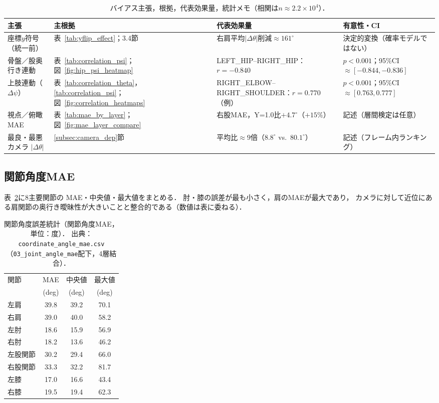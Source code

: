\documentclass[fleqn]{ieej}
\begin{document}
\begin{table}[!t]
\centering
\caption{バイアス主張，根拠，代表効果量，統計メモ（相関は$n\approx 2.2\times 10^{4}$）．}
\label{tab:bias_claim_evidence}
\footnotesize
\begin{tabular}{p{} p{} p{} p{}}
\toprule
主張 & 主根拠 & 代表効果量 & 有意性・CI \\
\midrule
座標$y$符号（統一前） &
表~\ref{tab:yflip_effect}；3.4節 &
右肩平均$|\Delta\theta|$削減$\approx\!161^{\circ}$ &
決定的変換（確率モデルではない） \\
骨盤／股奥行き連動 &
表~\ref{tab:correlation_psi}；図~\ref{fig:hip_psi_heatmap} &
LEFT\_HIP--RIGHT\_HIP：$r=-0.840$ &
$p<0.001$；95\%CI $\approx[-0.844,-0.836]$ \\
上肢連動（$\Delta\psi$） &
表~\ref{tab:correlation_theta}，\ref{tab:correlation_psi}；
図~\ref{fig:correlation_heatmaps} &
RIGHT\_ELBOW--RIGHT\_SHOULDER：$r=0.770$（例） &
$p<0.001$；95\%CI $\approx[0.763,0.777]$ \\
視点／俯瞰MAE &
表~\ref{tab:mae_by_layer}；図~\ref{fig:mae_layer_compare} &
右股MAE，Y=1.0比$+4.7^{\circ}$（$+15\%$） &
記述（層間検定は任意） \\
最良・最悪カメラ $|\Delta\theta|$ &
\ref{subsec:camera_dep}節 &
平均比$\approx 9$倍（$8.8^{\circ}$ vs.\ $80.1^{\circ}$） &
記述（フレーム内ランキング） \\
\bottomrule
\end{tabular}
\end{table}

\subsection{関節角度MAE}

表~\ref{tab:joint_angle_error}に8主要関節の
MAE・中央値・最大値をまとめる．
肘・膝の誤差が最も小さく，肩のMAEが最大であり，
カメラに対して近位にある肩関節の奥行き曖昧性が大きいことと整合的である（数値は表に委ねる）．

\begin{table}[!t]
\centering
\caption{関節角度誤差統計（関節角度MAE，単位：度）．
  出典：\texttt{coordinate\_angle\_mae.csv}（\texttt{03\_joint\_angle\_mae}配下，4層結合）．}
\label{tab:joint_angle_error}
\begin{tabular}{lccc}
\toprule
関節          & MAE    & 中央値 & 最大値  \\
              & (deg)  & (deg)  & (deg)  \\
\midrule
左肩  & 39.8   & 39.2   & 70.1   \\
右肩  & 39.0   & 40.0   & 58.2   \\
左肘  & 18.6   & 15.9   & 56.9   \\
右肘  & 18.2   & 13.6   & 46.2   \\
左股関節  & 30.2   & 29.4   & 66.0   \\
右股関節  & 33.3   & 32.2   & 81.7   \\
左膝  & 17.0   & 16.6   & 43.4   \\
右膝  & 19.5   & 19.4   & 62.3   \\
\bottomrule
\end{tabular}
\end{table}
\end{document}
